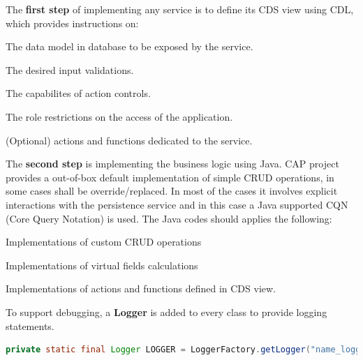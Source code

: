 The \textbf{first step} of implementing any service is to define its CDS view using CDL, which provides instructions on:
\begin{compactenum}
	\item The data model in database to be exposed by the service.
	\item The desired input validations.
	\item The capabilites of action controls.
    \item The role restrictions on the access of the application.
    \item (Optional) actions and functions dedicated to the service.
\end{compactenum}

\bigskip

The \textbf{second step} is implementing the business logic using Java. CAP project provides a out-of-box default implementation of simple CRUD \cite{crud} operations, in some cases shall be override/replaced. In most of the cases it involves explicit interactions with the persistence service and in this case a Java supported CQN (Core Query Notation) \cite{cap-cds-cqn} is used. The Java codes should applies the following:
\begin{compactenum}
	\item Implementations of custom CRUD operations
	\item Implementations of virtual fields calculations
	\item Implementations of actions and functions defined in CDS view.
\end{compactenum}

\bigskip
To support debugging, a \textbf{Logger} is added to every class to provide logging statements.

\begin{lstlisting}[language={java}]
 private static final Logger LOGGER = LoggerFactory.getLogger("name_logger");
\end{lstlisting}

